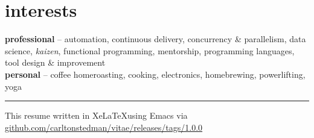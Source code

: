 \documentclass[]{vitae-cv}
\begin{document}

\section{interests}

\textbf{professional} -- automation, continuous delivery, concurrency
\& parallelism, data science, \emph{kaizen}, functional programming, mentorship, programming languages,
tool design \& improvement \\
\textbf{personal} -- coffee homeroasting, cooking, electronics, homebrewing,
powerlifting, yoga

\rule{\linewidth}{.25pt}

\small{This resume written in Xe\LaTeX using Emacs via \href{
    https://github.com/carltonstedman/vitae/releases/tags/1.0.0}{
    github.com/carltonstedman/vitae/releases/tags/1.0.0}}
\end{document}

